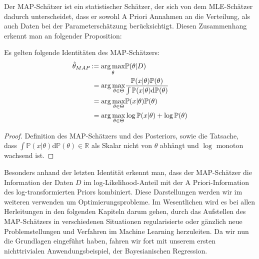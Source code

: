 Der MAP-Schätzer ist ein statistischer Schätzer, der sich von dem MLE-Schätzer dadurch unterscheidet, dass er sowohl A Priori Annahmen an die Verteilung, als auch Daten bei der Parameterschätzung berücksichtigt. Diesen Zusammenhang erkennt man an folgender Proposition:\vspace*{0,3cm}
\begin{propo}
	Es gelten folgende Identitäten des MAP-Schätzers:
	\begin{align*}
	\hat{\theta}_{MAP}\: &\hspace{-3pt}:= \underset{\theta}{\arg \max} \mathbb{P}(\theta \vert D) \\
						&= \arg\underset{\theta \in \Theta}{\max} \frac{ \mathbb{P}(x									\vert\theta) \mathbb{P}(\theta)}{\int  \mathbb{P}(x\vert 						\theta)\text{d}\mathbb{P}(\theta)} \\
 						&= \arg\underset{\theta \in \Theta}{\max}  \mathbb{P}(x\vert 									\theta) \mathbb{P}(\theta) \\
					 	&= \arg\underset{\theta \in \Theta}{\max} \log\mathbb{P}(x\vert 								\theta) + \log \mathbb{P}(\theta)
	\end{align*}
	\label{prop:map}
\end{propo}

\begin{proof}
Definition des MAP-Schätzers und des Posteriors, sowie die Tatsache, \\ dass $\int  \mathbb{P}(x\vert \theta) \text{d}\mathbb{P}(\theta) \in \mathbb{R}$ als Skalar nicht von $\theta$ abhängt und $\log$ monoton wachsend ist.
\end{proof}

Besonders anhand der letzten Identität erkennt man, dass der MAP-Schätzer die Information der Daten $D$ im log-Likelihood-Anteil mit der A Priori-Information des log-transformierten Priors kombiniert. Diese Darstellungen werden wir im weiteren verwenden um Optimierungsprobleme. Im Wesentlichen wird es bei allen Herleitungen in den folgenden Kapiteln darum gehen, durch das Aufstellen des MAP-Schätzers in verschiedenen Situationen regularisierte oder gänzlich neue Problemstellungen und Verfahren im Machine Learning herzuleiten. Da wir nun die Grundlagen eingeführt haben, fahren wir fort mit unserem ersten nichttrivialen Anwendungsbeispiel, der Bayesianischen Regression.



